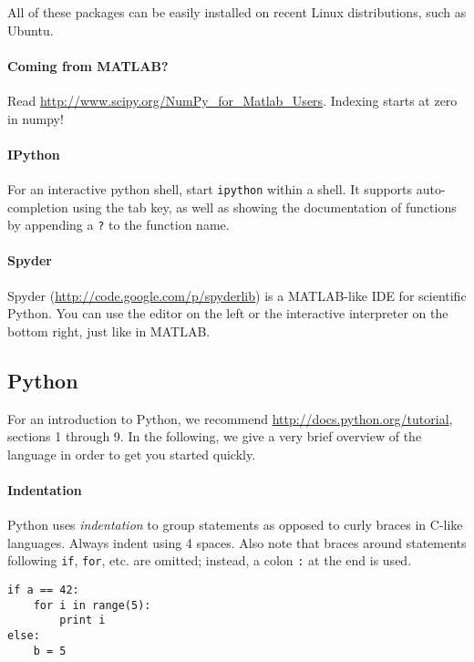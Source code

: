\documentclass{../uebungsblatt}
\begin{document}
All of these packages can be easily installed on recent Linux distributions,
such as Ubuntu.

\paragraph{Coming from MATLAB?}
Read \url{http://www.scipy.org/NumPy_for_Matlab_Users}. Indexing starts at
zero in numpy!

\paragraph{IPython}
For an interactive python shell, start \texttt{ipython} within a shell.
It supports auto-completion using the tab key, as well as showing the
documentation of functions by appending a \texttt{?} to the function name.

\paragraph{Spyder}
Spyder (\url{http://code.google.com/p/spyderlib}) is a MATLAB-like IDE
for scientific Python. You can use the editor on the left or the 
interactive interpreter on the bottom right, just like in MATLAB.

\subsection*{Python}

For an introduction to Python, we recommend
\url{http://docs.python.org/tutorial}, sections 1 through 9. In the following, we give a very brief overview of the language in order to get you started quickly. 

\paragraph{Indentation}
Python uses \emph{indentation} to group statements as opposed to curly braces
in C-like languages. Always indent using 4 spaces. Also note that braces
around statements following \lstinline!if!, \lstinline!for!, etc. are omitted;
instead, a colon \lstinline!:! at the end is used.
\vspace*{-0.5em}\begin{lstlisting}
if a == 42:
    for i in range(5):
        print i
else:
    b = 5
\end{lstlisting}\vspace*{-0.5em}
\end{document}
